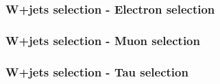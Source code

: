 \documentclass[red,compress,xcolor=table]{beamer}
\begin{document}
\begin{frame}
  \frametitle{W+jets selection -  Electron selection}

\vspace*{-1cm}
\begin{center}
{\tiny
\hspace*{-1cm}

}
\end{center}


\end{frame}

\begin{frame}
  \frametitle{W+jets selection -  Muon selection}

\vspace*{-1cm}
\begin{center}
{\tiny
\hspace*{-1cm}

}
\end{center}


\end{frame}

\begin{frame}
  \frametitle{W+jets selection -  Tau selection}

\vspace*{-1cm}
\begin{center}
{\tiny
\hspace*{-1cm}

}
\end{center}

\end{frame}



\end{document}
